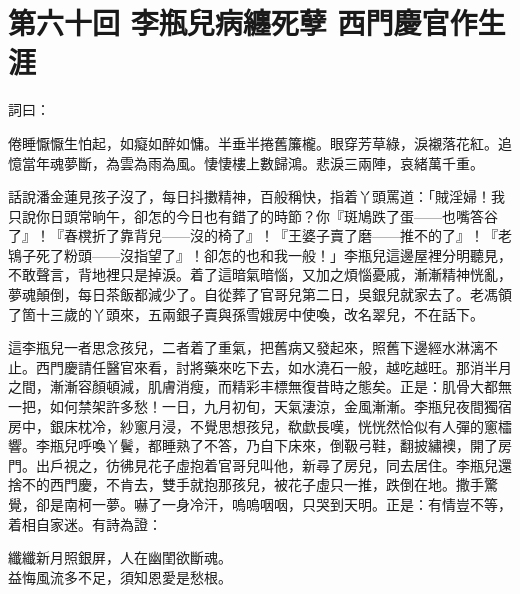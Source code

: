 
\chapter*{第六十回 李瓶兒病纏死孽 西門慶官作生涯}


詞曰：

\begin{myquote}
倦睡懨懨生怕起，如癡如醉如慵。半垂半捲舊簾櫳。眼穿芳草綠，淚襯落花紅。追憶當年魂夢斷，為雲為雨為風。悽悽樓上數歸鴻。悲淚三兩陣，哀緒萬千重。

\end{myquote}

話說潘金蓮見孩子沒了，每日抖擻精神，百般稱快，指着丫頭罵道：「賊淫婦！我只說你日頭常晌午，卻怎的今日也有錯了的時節？你『斑鳩跌了蛋——也嘴答谷了』！『春櫈折了靠背兒——沒的椅了』！『王婆子賣了磨——推不的了』！『老鴇子死了粉頭——沒指望了』！卻怎的也和我一般！」{}李瓶兒這邊屋裡分明聽見，不敢聲言，背地裡只是掉淚。着了這暗氣暗惱，又加之煩惱憂戚，漸漸精神恍亂，夢魂顛倒，每日茶飯都減少了。自從葬了官哥兒第二日，吳銀兒就家去了。老馮領了箇十三歲的丫頭來，五兩銀子賣與孫雪娥房中使喚，改名翠兒，不在話下。

這李瓶兒一者思念孩兒，二者着了重氣，把舊病又發起來，照舊下邊經水淋漓不止。西門慶請任醫官來看，討將藥來吃下去，如水澆石一般，越吃越旺。那消半月之間，漸漸容顏頓減，肌膚消瘦，而精彩丰標無復昔時之態矣。正是：肌骨大都無一把，如何禁架許多愁！一日，九月初旬，天氣淒涼，金風漸漸。李瓶兒夜間獨宿房中，銀床枕冷，紗窻月浸，不覺思想孩兒，欷歔長嘆，恍恍然恰似有人彈的窻櫺響。李瓶兒呼喚丫鬢，都睡熟了不答，乃自下床來，倒靸弓鞋，翻披繡襖，開了房門。出戶視之，彷彿見花子虛抱着官哥兒叫他，新尋了房兒，同去居住。李瓶兒還捨不的西門慶，不肯去，雙手就抱那孩兒，被花子虛只一推，跌倒在地。撒手驚覺，卻是南柯一夢。嚇了一身冷汗，嗚嗚咽咽，只哭到天明。{}正是：有情豈不等，着相自家迷。有詩為證：

\begin{myquote}
纖纖新月照銀屏，人在幽閨欲斷魂。\\益悔風流多不足，須知恩愛是愁根。
\end{myquote}

